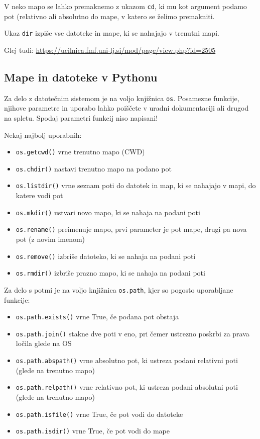 \documentclass[
]{book}
\providecommand{\tightlist}{%
  \setlength{\itemsep}{0pt}\setlength{\parskip}{0pt}}
\begin{document}
V neko mapo se lahko premaknemo z ukazom \texttt{cd}, ki mu kot argument podamo pot
(relativno ali absolutno do mape, v katero se želimo premakniti.

Ukaz \texttt{dir} izpiše vse datoteke in mape, ki se nahajajo v trenutni mapi.

Glej tudi: \url{https://ucilnica.fmf.uni-lj.si/mod/page/view.php?id=2505}

\hypertarget{mape-in-datoteke-v-pythonu}{%
\subsection{Mape in datoteke v Pythonu}\label{mape-in-datoteke-v-pythonu}}

Za delo z datotečnim sistemom je na voljo knjižnica \texttt{os}.
Posamezne funkcije, njihove parametre in uporabo lahko poiščete v uradni
dokumentaciji ali drugod na spletu. Spodaj parametri funkcij niso napisani!

Nekaj najbolj uporabnih:

\begin{itemize}
\tightlist
\item
  \texttt{os.getcwd()} vrne trenutno mapo (CWD)
\item
  \texttt{os.chdir()} nastavi trenutno mapo na podano pot
\item
  \texttt{os.listdir()} vrne seznam poti do datotek in map, ki se nahajajo v mapi, do katere vodi pot
\item
  \texttt{os.mkdir()} ustvari novo mapo, ki se nahaja na podani poti
\item
  \texttt{os.rename()} preimenuje mapo, prvi parameter je pot mape, drugi pa nova pot (z novim imenom)
\item
  \texttt{os.remove()} izbriše datoteko, ki se nahaja na podani poti
\item
  \texttt{os.rmdir()} izbriše prazno mapo, ki se nahaja na podani poti
\end{itemize}

Za delo s potmi je na voljo knjižnica \texttt{os.path}, kjer so pogosto uporabljane funkcije:

\begin{itemize}
\tightlist
\item
  \texttt{os.path.exists()} vrne True, če podana pot obstaja
\item
  \texttt{os.path.join()} stakne dve poti v eno, pri čemer ustrezno poskrbi za prava ločila glede na OS
\item
  \texttt{os.path.abspath()} vrne absolutno pot, ki ustreza podani relativni poti (glede na trenutno mapo)
\item
  \texttt{os.path.relpath()} vrne relativno pot, ki ustreza podani absolutni poti (glede na trenutno mapo)
\item
  \texttt{os.path.isfile()} vrne True, če pot vodi do datoteke
\item
  \texttt{os.path.isdir()} vrne True, če pot vodi do mape
\end{itemize}
\end{document}
